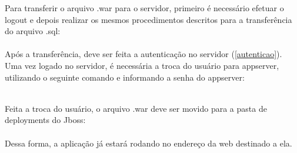 \documentclass[11pt,a4paper]{report}
\begin{document}
Para transferir o arquivo .war para o servidor, primeiro é necessário efetuar o logout e depois realizar os mesmos procedimentos descritos para a transferência do arquivo .sql: \\

 \\

Após a transferência, deve ser feita a autenticação no servidor (\ref{autenticao}). Uma vez logado no servidor, é necessária a troca do usuário para appserver, utilizando o seguinte comando e informando a senha do appserver:

 \\

Feita a troca do usuário, o arquivo .war deve ser movido para a pasta de deployments do Jboss: \\

 \\

Dessa forma, a aplicação já estará rodando no endereço da web destinado a ela.




\end{document}
